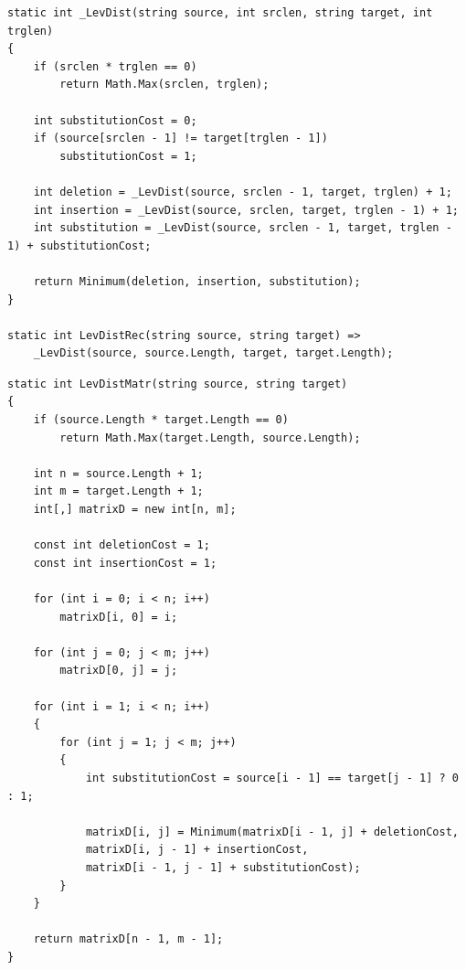 \documentclass{report}
\begin{document}
\begin{lstlisting}[label=code1,caption=Функция для рекурсивного нахождения расстояния Левенштейна]
static int _LevDist(string source, int srclen, string target, int trglen)
{
	if (srclen * trglen == 0)
		return Math.Max(srclen, trglen);
	
	int substitutionCost = 0;
	if (source[srclen - 1] != target[trglen - 1])
		substitutionCost = 1;
	
	int deletion = _LevDist(source, srclen - 1, target, trglen) + 1;
	int insertion = _LevDist(source, srclen, target, trglen - 1) + 1;
	int substitution = _LevDist(source, srclen - 1, target, trglen - 1) + substitutionCost;
	
	return Minimum(deletion, insertion, substitution);
}

static int LevDistRec(string source, string target) =>
	_LevDist(source, source.Length, target, target.Length);
\end{lstlisting}
\newpage
\begin{lstlisting}[label=code2,caption=Функция для нерекурсивного нахождения расстояния Левенштейна с кэшем в виде матрицы]
static int LevDistMatr(string source, string target)
{
	if (source.Length * target.Length == 0)
		return Math.Max(target.Length, source.Length);
	
	int n = source.Length + 1;
	int m = target.Length + 1;
	int[,] matrixD = new int[n, m];
	
	const int deletionCost = 1;
	const int insertionCost = 1;
	
	for (int i = 0; i < n; i++)
		matrixD[i, 0] = i;
	
	for (int j = 0; j < m; j++)
		matrixD[0, j] = j;
	
	for (int i = 1; i < n; i++)
	{
		for (int j = 1; j < m; j++)
		{
			int substitutionCost = source[i - 1] == target[j - 1] ? 0 : 1;
			
			matrixD[i, j] = Minimum(matrixD[i - 1, j] + deletionCost,          
			matrixD[i, j - 1] + insertionCost,         
			matrixD[i - 1, j - 1] + substitutionCost); 
		}
	}
	
	return matrixD[n - 1, m - 1];
}
\end{lstlisting}
\end{document}
